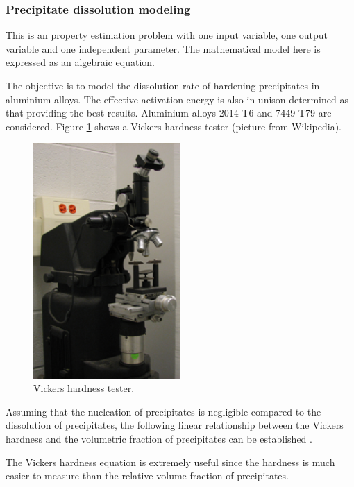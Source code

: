 \subsubsection*{Precipitate dissolution modeling}

This is an property estimation problem with one input variable, one output variable and one independent parameter. 
The mathematical model here is expressed as an algebraic equation. 

The objective is to model the dissolution rate of hardening precipitates in aluminium alloys. 
The effective activation energy is also in unison determined as that providing the best results. 
Aluminium alloys 2014-T6 and 7449-T79 are considered. 
Figure \ref{VickersTesterFigure} shows a Vickers hardness tester (picture from Wikipedia). 

\begin{figure}[h!]
\begin{center}
\includegraphics[width=0.5\textwidth]{inverse_problems/vickers_tester}
\caption{Vickers hardness tester.}\label{VickersTesterFigure}
\end{center}
\end{figure}

Assuming that the nucleation of precipitates is
negligible compared to the dissolution of precipitates, the
following linear relationship between the Vickers hardness and the
volumetric fraction of precipitates can be established
\cite{Myrh1991b}.

The Vickers hardness equation is extremely useful since the
hardness is much easier to measure than the relative volume
fraction of precipitates.

